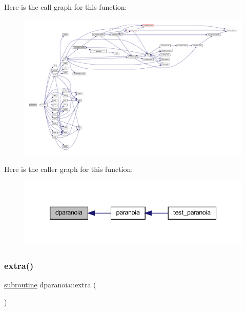 Here is the call graph for this function\+:
\nopagebreak
\begin{figure}[H]
\begin{center}
\leavevmode
\includegraphics[width=350pt]{dparanoia_8f90_aea61249b658024bcb8b5812d70a64b93_cgraph}
\end{center}
\end{figure}
Here is the caller graph for this function\+:
\nopagebreak
\begin{figure}[H]
\begin{center}
\leavevmode
\includegraphics[width=339pt]{dparanoia_8f90_aea61249b658024bcb8b5812d70a64b93_icgraph}
\end{center}
\end{figure}
\mbox{\label{dparanoia_8f90_a8b0cecca050456b522805e7a3ebe3398}} 
\subsubsection{\texorpdfstring{extra()}{extra()}}
{\footnotesize\ttfamily \hyperlink{M__stopwatch_83_8txt_acfbcff50169d691ff02d4a123ed70482}{subroutine} dparanoia\+::extra (\begin{DoxyParamCaption}{ }\end{DoxyParamCaption})}

